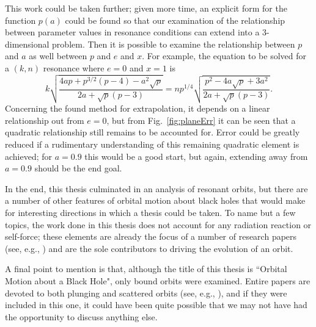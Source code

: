 This work could be taken further; given more time, an explicit form for the function $p(a)$ could be found so that our examination of the relationship between parameter values in resonance conditions can extend into a 3-dimensional problem.
Then it is possible to examine the relationship between $p$ and $a$ as well between $p$ and $e$ and $x$.
For example, the equation to be solved for a $(k,n)$ resonance where $e=0$ and $x=1$ is
\begin{equation}
    k\sqrt{\frac{4ap+p^{3/2}(p-4)-a^2\sqrt{p}}{2a+\sqrt{p}(p-3)}}=np^{1/4}\sqrt{\frac{p^2-4a\sqrt{p}+3a^2}{2a+\sqrt{p}(p-3)}}.
\end{equation}
Concerning the found method for extrapolation, it depends on a linear relationship out from $e=0$, but from Fig.~\eqref{fig:planeErr} it can be seen that a quadratic relationship still remains to be accounted for.
Error could be greatly reduced if a rudimentary understanding of this remaining quadratic element is achieved; for $a=0.9$ this would be a good start, but again, extending away from $a=0.9$ should be the end goal.

In the end, this thesis culminated in an analysis of resonant orbits, but there are a number of other features of orbital motion about black holes that would make for interesting directions in which a thesis could be taken.
To name but a few topics, the work done in this thesis does not account for any radiation reaction or self-force; these elements are already the focus of a number of research papers (see, e.g., \cite{SagoRadReac, GaltsovRadReac, MeentSelfForce}) and are the sole contributors to driving the evolution of an orbit.

A final point to mention is that, although the title of this thesis is ``Orbital Motion about a Black Hole", only bound orbits were examined. Entire papers are devoted to both plunging and scattered orbits (see, e.g., \cite{plungingExample, scatteredExample}), and if they were included in this one, it could have been quite possible that we may not have had the opportunity to discuss anything else.